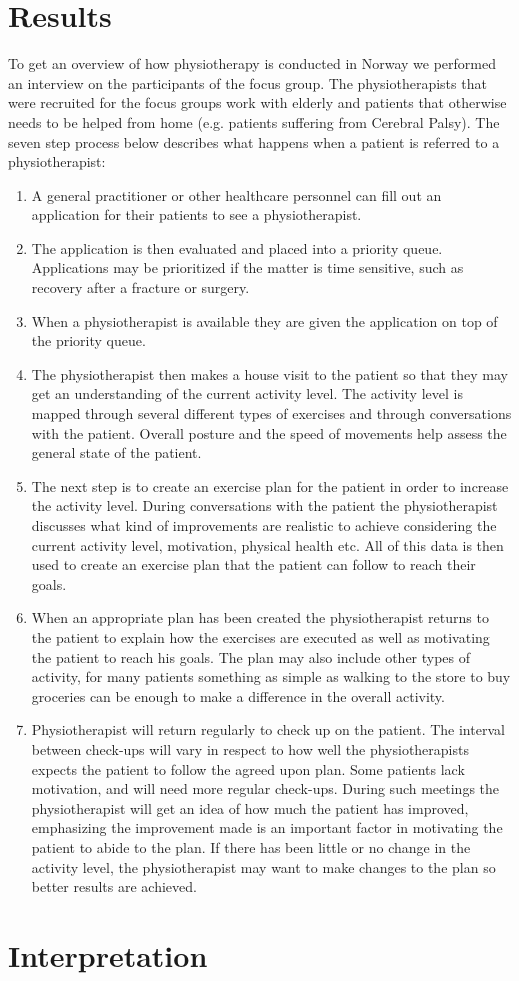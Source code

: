 \section{Results}

To get an overview of how physiotherapy is conducted in Norway we performed an interview on the participants of the focus group. The physiotherapists that were recruited for the focus groups work with elderly and patients that otherwise needs to be helped from home (e.g. patients suffering from Cerebral Palsy). The seven step process below describes what happens when a patient is referred to a physiotherapist:

\vspace{-4mm}
\begin{enumerate}
  \item A general practitioner or other healthcare personnel can fill out an application for their patients to see a physiotherapist.
  \item The application is then evaluated and placed into a priority queue. Applications may be prioritized if the matter is time sensitive, such as recovery after a fracture or surgery.
  \item When a physiotherapist is available they are given the application on top of the priority queue.
  \item The physiotherapist then makes a house visit to the patient so that they may get an understanding of the current activity level. The activity level is mapped through several different types of exercises and through conversations with the patient. Overall posture and the speed of movements help assess the general state of the patient.
  \item The next step is to create an exercise plan for the patient in order to increase the activity level. During conversations with the patient the physiotherapist discusses what kind of improvements are realistic to achieve considering the current activity level, motivation, physical health etc. All of this data is then used to create an exercise plan that the patient can follow to reach their goals.
  \item When an appropriate plan has been created the physiotherapist returns to the patient to explain how the exercises are executed as well as motivating the patient to reach his goals. The plan may also include other types of activity, for many patients something as simple as walking to the store to buy groceries can be enough to make a difference in the overall activity.
  \item Physiotherapist will return regularly to check up on the patient. The interval between check-ups will vary in respect to how well the physiotherapists expects the patient to follow the agreed upon plan. Some patients lack motivation, and will need more regular check-ups. During such meetings the physiotherapist will get an idea of how much the patient has improved, emphasizing the improvement made is an important factor in motivating the patient to abide to the plan. If there has been little or no change in the activity level, the physiotherapist may want to make changes to the plan so better results are achieved.
\end{enumerate}


\section{Interpretation}
